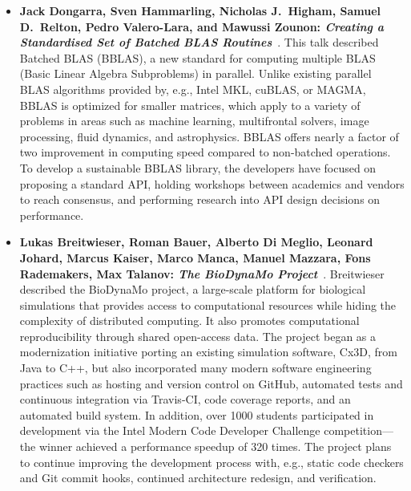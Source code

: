 \documentclass[11pt, oneside]{amsart}
\begin{document}
\begin{itemize}[itemsep=1ex]
    \item \textbf{Jack Dongarra, Sven Hammarling, Nicholas J.\ Higham, Samuel
    D.\ Relton\textsuperscript{\textasteriskcentered}, Pedro Valero-Lara,
    and Mawussi Zounon: \textit{Creating a Standardised Set of Batched
    BLAS Routines}}~\cite{Dongarra:2016ws}.
    This talk described Batched BLAS (BBLAS), a new standard for computing multiple
    BLAS (Basic Linear Algebra Subproblems) in parallel. Unlike existing parallel
    BLAS algorithms provided by, e.g., Intel MKL, cuBLAS, or MAGMA, BBLAS is
    optimized for smaller matrices, which apply to a variety of problems in areas
    such as machine learning, multifrontal solvers, image processing, fluid
    dynamics, and astrophysics. BBLAS offers nearly a factor of two improvement
    in computing speed compared to non-batched operations. To develop a sustainable
    BBLAS library, the developers have focused on proposing a standard API,
    holding workshops between academics and vendors to reach consensus, and
    performing research into API design decisions on performance.

    \item \textbf{Lukas Breitwieser\textsuperscript{\textasteriskcentered},
    Roman Bauer, Alberto Di Meglio, Leonard Johard,
    Marcus Kaiser, Marco Manca, Manuel Mazzara, Fons Rademakers,
    Max Talanov: \textit{The BioDynaMo Project}}~\cite{Bauer:2016ws}.
    Breitwieser described the BioDynaMo project, a large-scale platform for
    biological simulations that provides access to computational resources while
    hiding the complexity of distributed computing. It also promotes computational
    reproducibility through shared open-access data. The project began as a
    modernization initiative porting an existing simulation software, Cx3D, from
    Java to C++, but also incorporated many modern software engineering practices
    such as hosting and version control on GitHub, automated tests and continuous
    integration via Travis-CI, code coverage reports, and an automated build system.
    In addition, over 1000 students participated in development via the Intel
    Modern Code Developer Challenge competition---the winner achieved a
    performance speedup of 320 times. The project plans to continue improving
    the development process with, e.g., static code checkers and Git commit hooks,
    continued architecture redesign, and verification.


\end{itemize}
\end{document}
